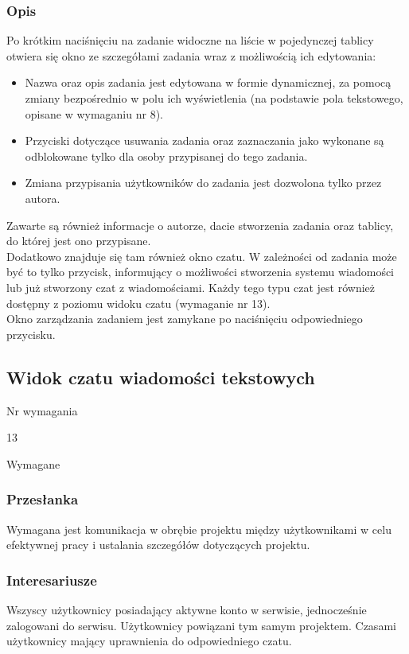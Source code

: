 \documentclass[eng,printmode]{mgr}
\begin{document}
\subsubsection{Opis}
Po krótkim naciśnięciu na zadanie widoczne na liście w pojedynczej tablicy otwiera się okno ze szczegółami zadania wraz z możliwością ich edytowania:
\begin{itemize}
  \item[--] Nazwa oraz opis zadania jest edytowana w formie dynamicznej, za pomocą zmiany bezpośrednio w polu ich wyświetlenia (na podstawie pola tekstowego, opisane w wymaganiu nr 8).
  \item[--] Przyciski dotyczące usuwania zadania oraz zaznaczania jako wykonane są odblokowane tylko dla osoby przypisanej do tego zadania.
  \item[--] Zmiana przypisania użytkowników do zadania jest dozwolona tylko przez autora.
\end{itemize}
Zawarte są również informacje o autorze, dacie stworzenia zadania oraz tablicy, do której jest ono przypisane. \\
Dodatkowo znajduje się tam również okno czatu. W zależności od zadania może być to tylko przycisk, informujący o możliwości stworzenia systemu wiadomości lub już stworzony czat z wiadomościami. Każdy tego typu czat jest również dostępny z poziomu widoku czatu (wymaganie nr  13).\\
Okno zarządzania zadaniem jest zamykane po naciśnięciu odpowiedniego przycisku.
\newpage

\subsection{Widok czatu wiadomości tekstowych}
\begin{labeling}{Nr wymagania}
\item [Nr wymagania:] 13
\item [Priorytet:] Wymagane
\end{labeling}

\subsubsection{Przesłanka}
Wymagana jest komunikacja w obrębie projektu między użytkownikami w celu efektywnej pracy i ustalania szczegółów dotyczących projektu.

\subsubsection{Interesariusze}
Wszyscy użytkownicy posiadający aktywne konto w serwisie, jednocześnie zalogowani do serwisu. Użytkownicy powiązani tym samym projektem. Czasami użytkownicy mający uprawnienia do odpowiedniego czatu.
\end{document}
